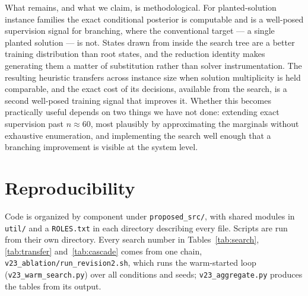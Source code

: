 \documentclass[final,5p,times,twocolumn]{elsarticle}
\begin{document}
What remains, and what we claim, is methodological. For planted-solution instance families the exact conditional posterior is computable and is a well-posed supervision signal for branching, where the conventional target --- a single planted solution --- is not. States drawn from inside the search tree are a better training distribution than root states, and the reduction identity makes generating them a matter of substitution rather than solver instrumentation. The resulting heuristic transfers across instance size when solution multiplicity is held comparable, and the exact cost of its decisions, available from the search, is a second well-posed training signal that improves it. Whether this becomes practically useful depends on two things we have not done: extending exact supervision past $n\approx60$, most plausibly by approximating the marginals without exhaustive enumeration, and implementing the search well enough that a branching improvement is visible at the system level.

\section*{Reproducibility}

Code is organized by component under \texttt{proposed\_src/}, with shared modules in \texttt{util/} and a \texttt{ROLES.txt} in each directory describing every file. Scripts are run from their own directory. Every search number in Tables~\ref{tab:search}, \ref{tab:transfer} and~\ref{tab:cascade} comes from one chain, \texttt{v23\_ablation/run\_revision2.sh}, which runs the warm-started loop (\texttt{v23\_warm\_search.py}) over all conditions and seeds; \texttt{v23\_aggregate.py} produces the tables from its output.
\end{document}
